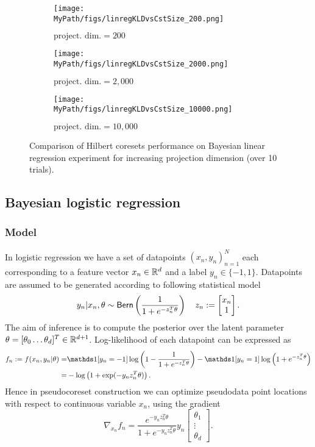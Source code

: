 \begin{figure}[!t]
	\centering
	\begin{subfigure}[]{.295\textwidth}
		\centerline{\texttt{[image: \\MyPath/figs/linregKLDvsCstSize\_200.png]}}%
		\caption{$\text{project. dim.}=200$}
	\end{subfigure}\hfill\qquad
	\centering
	\begin{subfigure}[]{.295\textwidth}
		\centerline{\texttt{[image: \\MyPath/figs/linregKLDvsCstSize\_2000.png]}}%
		\caption{$\text{project. dim.}=2,000$}
	\end{subfigure}\hfill\qquad
	\centering
	\begin{subfigure}[]{.295\textwidth}
		\centerline{\texttt{[image: \\MyPath/figs/linregKLDvsCstSize\_10000.png]}}%
		\caption{$\text{project. dim.}=10,000$}
	\end{subfigure}
	\caption{Comparison of Hilbert coresets performance on Bayesian linear regression experiment for increasing projection dimension (over 10 trials).}
	\label{fig:hilbert_varying_projdim}
\end{figure}



\subsection{Bayesian logistic regression}
\label{app:logreg_experiment_appendix}

\subsubsection{Model}
\label{app:logreg_model_appendix}
In logistic regression we have a set of datapoints $(x_n, y_n)_{n=1}^{N}$ each corresponding to a feature vector ${x_n \in \mathbb{R}^d}$ and a label ${y_n \in \{-1, 1\}}$. Datapoints are assumed to be generated according to following statistical model
\[
y_n | x_n, \theta \sim {\sf{Bern}} \left( \frac{1}{1+e^{-z_n^T \theta}} \right) 
\quad 
z_n := \begin{bmatrix}
x_n \\
1
\end{bmatrix}.
\label{eq:logreg-model}
\]
The aim of inference is to compute the posterior over the latent parameter $ \theta = [\theta_0 \ldots \theta_d]^T \in \mathbb{R}^{d+1}$.
Log-likelihood of each datapoint can be expressed as
\[
\begin{split}
f_n := f(x_n, y_n|\theta)  
=&\ind{[y_n=-1]}\log \left( 1 - \frac{1}{1+e^{-z_n^T \theta}}\right) 
- \ind{[y_n=1]} \log \left( 1+ e^{-z_n^T \theta}  \right) \\
=&-\log\left( 1 + \exp(-y_n z_n^T\theta)\right).
\label{eq:logreg-loglik}
\end{split}
\]
Hence in pseudocoreset construction we can optimize pseudodata point locations with respect to continuous variable $ x_n$, using the gradient
\[
\nabla_{x_n}f_n =  \frac{e^{-y_n z_n^T \theta}}{1+e^{-y_n z_n^T \theta}}y_n \begin{bmatrix}
\theta_1 \\
\vdots \\
\theta_d
\end{bmatrix}.
\label{eq:logreg-loglik-locgrad}
\]


